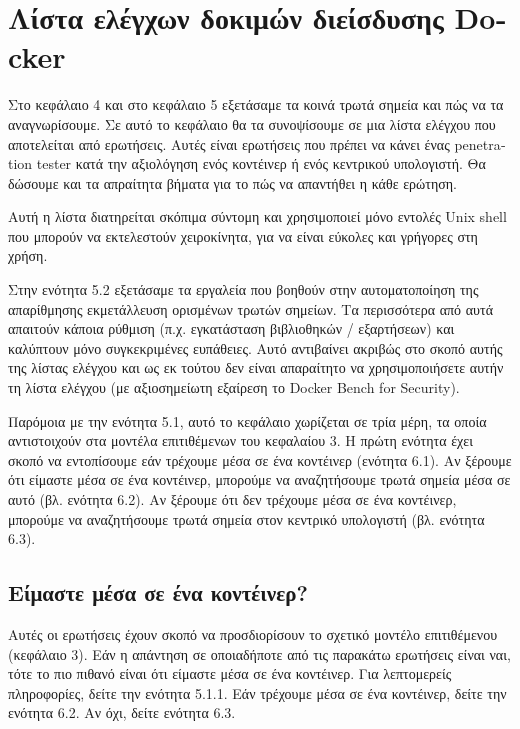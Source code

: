 \chapter{Λίστα ελέγχων δοκιμών διείσδυσης \textlatin{Docker}}
\label{dockerPenTestChecklist}

Στο κεφάλαιο 4 και στο κεφάλαιο 5 εξετάσαμε τα κοινά τρωτά σημεία και πώς
να τα αναγνωρίσουμε. Σε αυτό το κεφάλαιο θα τα συνοψίσουμε σε μια λίστα ελέγχου
που αποτελείται από ερωτήσεις. Αυτές είναι ερωτήσεις που πρέπει να κάνει ένας
\textlatin{penetration tester} κατά την αξιολόγηση ενός κοντέινερ ή ενός
κεντρικού υπολογιστή. Θα δώσουμε και τα απραίτητα βήματα για το πώς να απαντήθει
η κάθε ερώτηση.

Αυτή η λίστα διατηρείται σκόπιμα σύντομη και χρησιμοποιεί μόνο εντολές
\textlatin{Unix shell} που μπορούν να εκτελεστούν χειροκίνητα, για να είναι
εύκολες και γρήγορες στη χρήση.

Στην ενότητα 5.2 εξετάσαμε τα εργαλεία που βοηθούν στην αυτοματοποίηση της
απαρίθμησης εκμετάλλευση ορισμένων τρωτών σημείων. Τα περισσότερα από αυτά
απαιτούν κάποια ρύθμιση (π.χ. εγκατάσταση βιβλιοθηκών / εξαρτήσεων) και
καλύπτουν μόνο συγκεκριμένες ευπάθειες. Αυτό αντιβαίνει ακριβώς στο σκοπό αυτής
της λίστας ελέγχου και ως εκ τούτου δεν είναι απαραίτητο να χρησιμοποιήσετε
αυτήν τη λίστα ελέγχου (με αξιοσημείωτη εξαίρεση το
\textlatin{Docker Bench for Security}).

Παρόμοια με την ενότητα 5.1, αυτό το κεφάλαιο χωρίζεται σε τρία μέρη, τα οποία
αντιστοιχούν στα μοντέλα επιτιθέμενων του κεφαλαίου 3. Η πρώτη ενότητα έχει
σκοπό να εντοπίσουμε εάν τρέχουμε μέσα σε ένα κοντέινερ (ενότητα 6.1). Αν
ξέρουμε ότι είμαστε μέσα σε ένα κοντέινερ, μπορούμε να αναζητήσουμε τρωτά σημεία
μέσα σε αυτό (βλ. ενότητα 6.2). Αν ξέρουμε ότι δεν τρέχουμε μέσα σε ένα
κοντέινερ, μπορούμε να αναζητήσουμε τρωτά σημεία στον κεντρικό υπολογιστή (βλ.
ενότητα 6.3).

\section{Είμαστε μέσα σε ένα κοντέινερ?}

Αυτές οι ερωτήσεις έχουν σκοπό να προσδιορίσουν το σχετικό μοντέλο επιτιθέμενου
(κεφάλαιο 3). Εάν η απάντηση σε οποιαδήποτε από τις παρακάτω ερωτήσεις είναι
ναι, τότε το πιο πιθανό είναι ότι είμαστε μέσα σε ένα κοντέινερ. Για λεπτομερείς
πληροφορίες, δείτε την ενότητα 5.1.1. Εάν τρέχουμε μέσα σε ένα κοντέινερ, δείτε
την ενότητα 6.2. Αν όχι, δείτε ενότητα 6.3. \\

